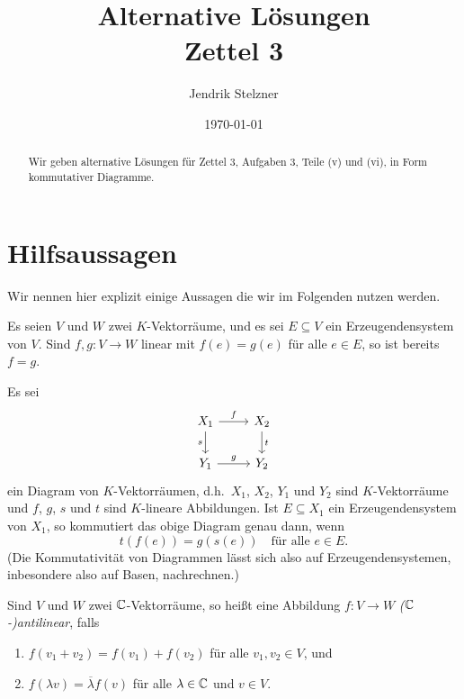 \documentclass[a4paper,10pt]{article}
\title{Alternative Lösungen \\ Zettel 3}
\author{Jendrik Stelzner}
\date{\today}
\begin{document}
\maketitle










\begin{abstract}
  Wir geben alternative Lösungen für Zettel 3, Aufgaben 3, Teile (v) und (vi), in Form kommutativer Diagramme.
\end{abstract}










\section{Hilfsaussagen}

Wir nennen hier explizit einige Aussagen die wir im Folgenden nutzen werden.

\begin{lemma}
  Es seien $V$ und $W$ zwei $K$-Vektorräume, und es sei $E \subseteq V$ ein Erzeugendensystem von $V$.
  Sind $f, g \colon V \to W$ linear mit $f(e) = g(e)$ für alle $e \in E$, so ist bereits $f = g$.
\end{lemma}


\begin{corollary}
  Es sei
  \[
    \begin{tikzcd}
        X_1
        \arrow[r, "f"]
        \arrow[d, "s"']
      & X_2
        \arrow[d, "t"]
      \\
        Y_1
        \arrow[r, "g"]
      & Y_2
    \end{tikzcd}
  \]
  ein Diagram von $K$-Vektorräumen, d.h.\ $X_1$, $X_2$, $Y_1$ und $Y_2$ sind $K$-Vektorräume und $f$, $g$, $s$ und $t$ sind $K$-lineare Abbildungen.
  Ist $E \subseteq X_1$ ein Erzeugendensystem von $X_1$, so kommutiert das obige Diagram genau dann, wenn
  \[
    t(f(e)) = g(s(e))
    \quad
    \text{für alle $e \in E$}.
  \]
  (Die Kommutativität von Diagrammen lässt sich also auf Erzeugendensystemen, inbesondere also auf Basen, nachrechnen.)
\end{corollary}


\begin{definition}
  Sind $V$ und $W$ zwei $\mathbb{C}$-Vektorräume, so heißt eine Abbildung $f \colon V \to W$ \emph{($\mathbb{C}$-)antilinear}, falls
  \begin{enumerate}
    \item
      $f(v_1 + v_2) = f(v_1) + f(v_2)$ für alle $v_1, v_2 \in V$, und
    \item
      $f(\lambda v) = \overline{\lambda} f(v)$ für alle $\lambda \in \mathbb{C}$ und $v \in V$.
  \end{enumerate}
\end{definition}
\end{document}

